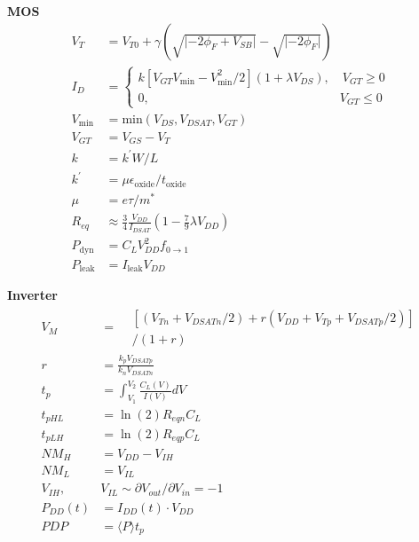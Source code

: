 \documentclass[12pt]{article}
\begin{document}
\begin{multicols}{2}
  \textbf{MOS}
  \begin{align}
    V_T &= V_{T0} + \gamma (\sqrt{\lvert -2\phi_F + V_{SB}\rvert} - \sqrt{\lvert -2\phi_F \rvert})\\
    I_D &= \begin{cases}
      k[V_{GT}V_{\textrm{min}} - V_{\textrm{min}}^2/2](1 + \lambda V_{DS}), \quad V_{GT} \geq 0\\
      0, \qquad \qquad \qquad \qquad \qquad \qquad \qquad \quad \; V_{GT} \leq 0
    \end{cases}\\ %
    V_{\textrm{min}} &= \textrm{min}(V_{DS}, V_{DSAT}, V_{GT}) \nonumber\\
    V_{GT} &= V_{GS} - V_T \nonumber\\
    k &= k^{\prime} W / L \nonumber\\
    k^{\prime} &= \mu \epsilon_{\textrm{oxide}} / t_{\textrm{oxide}} \nonumber\\ %
    \mu &= e \tau / m^{*} \nonumber\\
    R_{eq} &\approx \frac{3}{4} \frac{V_{DD}}{I_{DSAT}}(1 - \frac{7}{9} \lambda V_{DD})\\ %
    P_{\textrm{dyn}} &= C_L V_{DD}^2 f_{0 \rightarrow 1}\\ %
    P_{\textrm{leak}} &= I_{\textrm{leak}} V_{DD}
  \end{align}

  \textbf{Inverter}
  \begin{align}
    V_M &= \begin{aligned}
      &[(V_{Tn} + V_{DSATn}/2) + r (V_{DD} + V_{Tp} + V_{DSATp}/2)]\\ %
      &/ (1 + r)
    \end{aligned}\\
    r &= \frac{k_p V_{DSATp}}{k_n V_{DSATn}} \nonumber\\
    t_p &= \int_{V_1}^{V_2} \frac{C_L(V)}{I(V)} dV\\ %
    t_{pHL} &= \ln(2)R_{eqn}C_L\\ %
    t_{pLH} &= \ln(2)R_{eqp}C_L\\ %
    NM_H &= V_{DD} - V_{IH}\\ %
    NM_L &= V_{IL}\\
    V_{IH}, &V_{IL} \sim \partial V_{out}/\partial V_{in} = -1\\
    P_{DD}(t) &= I_{DD}(t) \cdot  V_{DD}\\ %
    PDP &= \langle P \rangle t_p %
  \end{align}


\end{multicols}
\end{document}
